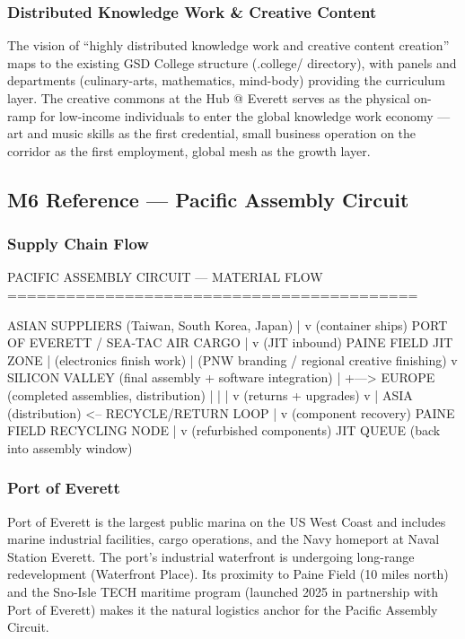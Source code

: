 \documentclass[11pt,letterpaper]{article}
\begin{document}
\subsubsection{Distributed Knowledge Work \& Creative Content}

The vision of ``highly distributed knowledge work and creative content creation'' maps to the existing GSD College structure (.college/ directory), with panels and departments (culinary-arts, mathematics, mind-body) providing the curriculum layer. The creative commons at the Hub @ Everett serves as the physical on-ramp for low-income individuals to enter the global knowledge work economy --- art and music skills as the first credential, small business operation on the corridor as the first employment, global mesh as the growth layer.

\subsection{M6 Reference --- Pacific Assembly Circuit}

\subsubsection{Supply Chain Flow}

\begin{asciibox}
PACIFIC ASSEMBLY CIRCUIT — MATERIAL FLOW
==========================================

ASIAN SUPPLIERS (Taiwan, South Korea, Japan)
       |
       v (container ships)
PORT OF EVERETT / SEA-TAC AIR CARGO
       |
       v (JIT inbound)
PAINE FIELD JIT ZONE
       | (electronics finish work)
       | (PNW branding / regional creative finishing)
       v
SILICON VALLEY (final assembly + software integration)
       |
       +---> EUROPE (completed assemblies, distribution)
       |         |
       |         v (returns + upgrades)
       v         |
ASIA (distribution) <-- RECYCLE/RETURN LOOP
       |
       v (component recovery)
PAINE FIELD RECYCLING NODE
       |
       v (refurbished components)
JIT QUEUE (back into assembly window)
\end{asciibox}

\subsubsection{Port of Everett}

Port of Everett is the largest public marina on the US West Coast and includes marine industrial facilities, cargo operations, and the Navy homeport at Naval Station Everett. The port's industrial waterfront is undergoing long-range redevelopment (Waterfront Place). Its proximity to Paine Field (10 miles north) and the Sno-Isle TECH maritime program (launched 2025 in partnership with Port of Everett) makes it the natural logistics anchor for the Pacific Assembly Circuit.
\end{document}
